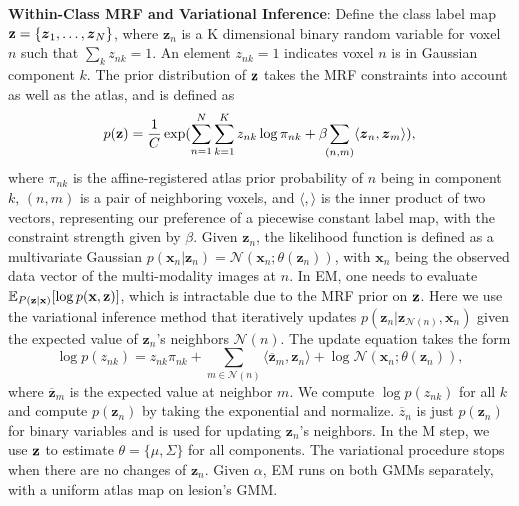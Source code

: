 \documentclass{article}
\renewcommand{\vec}[1]{\boldsymbol{#1}}
\newcommand{\mat}[1]{\text{\bf #1}}
\begin{document}
\noindent \textbf{Within-Class MRF and Variational Inference}: Define the class
label map $\mat z = \{\vec z_1, \dots, \vec z_N\}$, where $\vec z_n$ is a K
dimensional binary random variable for voxel $n$ such that $\sum_k \!z_{nk}
\!=\! 1$. An element $z_{nk}\!=\!1$ indicates voxel $n$ is in Gaussian component
$k$. The prior distribution of $\mat z$ takes the MRF constraints into account
as well as the atlas, and is defined as
\begin{equation*}
  p(\mat z) = \frac{1}{C} \exp( \sum_{n=1}^N \sum_{k=1}^K z_{nk} \log \pi_{nk} + \beta \!\!\sum_{(n,m)} \langle \vec z_n, \vec z_m \rangle ),
\end{equation*}
where $\pi_{nk}$ is the affine-registered atlas prior probability of $n$ being
in component $k$, $(n, m)$ is a pair of neighboring voxels, and $\langle, \rangle$
is the inner product of two vectors, representing our preference of a piecewise
constant label map, with the constraint strength given by $\beta$. Given $\vec
z_n$, the likelihood function is defined as a multivariate Gaussian $p(\vec x_n |
\vec z_n) = \mathcal{N}(\vec x_n; \theta(\vec z_n))$, with $\vec x_n$ being the
observed data vector of the multi-modality images at $n$. In EM, one needs to
evaluate $\mathbb{E}_{P(\mat z |\mat x)} [\log p(\mat x, \mat z)]$, which is
intractable due to the MRF prior on $\mat z$. Here we use the variational
inference method that iteratively updates $p(\vec z_n|\vec z_{\mathcal{N}(n)},
\vec x_n)$ given the expected value of $\vec z_n$'s neighbors
$\mathcal{N}(n)$. The update equation takes the form
\begin{equation*}
  \log p(z_{nk}) = z_{nk} \pi_{nk} + \!\!\!\!\! \sum_{m\in \mathcal{N}(n)} \!\!\!\langle \overline {\vec z}_m, \vec z_n \rangle + \log \mathcal{N} (\vec x_n; \theta(\vec z_n)),
\end{equation*}
where $\overline {\vec z}_m$ is the expected value at neighbor $m$. We
compute $\log p(z_{nk})$ for all $k$ and compute $p(\vec z_n)$ by taking the
exponential and normalize. $\overline{z}_n$ is just $p(\vec z_n)$ for binary
variables and is used for updating $\vec z_n$'s neighbors. In the M step, we
use $\mat z$ to estimate $\theta = \{\mu, \Sigma\}$ for all components. The
variational procedure stops when there are no changes of $\vec z_n$. Given $\alpha$, EM runs
on both GMMs separately, with a uniform atlas map on lesion's GMM.
\end{document}
